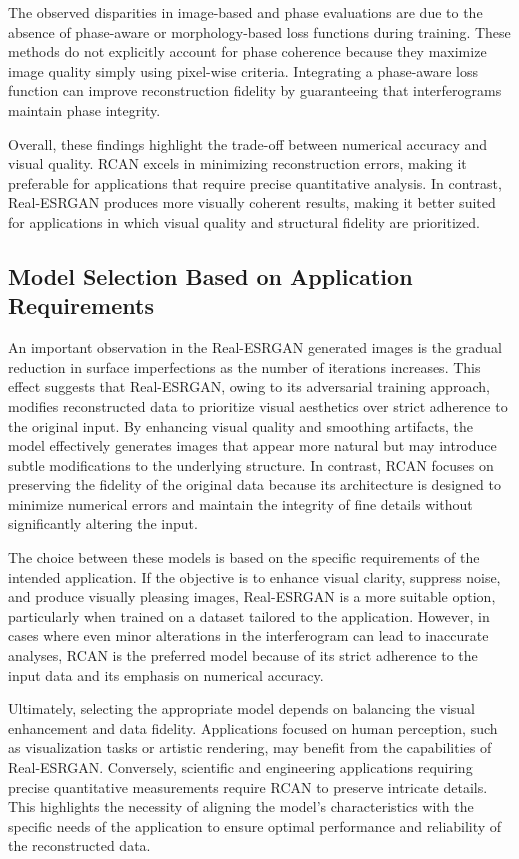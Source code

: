 \documentclass[10pt,twocolumn]{article}
\begin{document}
The observed disparities in image-based and phase evaluations are due to the absence of phase-aware or morphology-based loss functions during training. These methods do not explicitly account for phase coherence because they maximize image quality simply using pixel-wise criteria. Integrating a phase-aware loss function can improve reconstruction fidelity by guaranteeing that interferograms maintain phase integrity.

Overall, these findings highlight the trade-off between numerical accuracy and visual quality. RCAN excels in minimizing reconstruction errors, making it preferable for applications that require precise quantitative analysis. In contrast, Real-ESRGAN produces more visually coherent results, making it better suited for applications in which visual quality and structural fidelity are prioritized.

\subsection{Model Selection Based on Application Requirements}

An important observation in the Real-ESRGAN generated images is the gradual reduction in surface imperfections as the number of iterations increases. This effect suggests that Real-ESRGAN, owing to its adversarial training approach, modifies reconstructed data to prioritize visual aesthetics over strict adherence to the original input. By enhancing visual quality and smoothing artifacts, the model effectively generates images that appear more natural but may introduce subtle modifications to the underlying structure. In contrast, RCAN focuses on preserving the fidelity of the original data because its architecture is designed to minimize numerical errors and maintain the integrity of fine details without significantly altering the input.

The choice between these models is based on the specific requirements of the intended application. If the objective is to enhance visual clarity, suppress noise, and produce visually pleasing images, Real-ESRGAN is a more suitable option, particularly when trained on a dataset tailored to the application. However, in cases where even minor alterations in the interferogram can lead to inaccurate analyses, RCAN is the preferred model because of its strict adherence to the input data and its emphasis on numerical accuracy.

Ultimately, selecting the appropriate model depends on balancing the visual enhancement and data fidelity. Applications focused on human perception, such as visualization tasks or artistic rendering, may benefit from the capabilities of Real-ESRGAN. Conversely, scientific and engineering applications requiring precise quantitative measurements require RCAN to preserve intricate details. This highlights the necessity of aligning the model’s characteristics with the specific needs of the application to ensure optimal performance and reliability of the reconstructed data.
\end{document}
